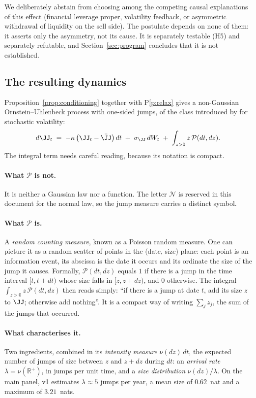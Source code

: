 We deliberately abstain from choosing among the competing causal explanations of
this effect (financial leverage proper, volatility feedback, or asymmetric
withdrawal of liquidity on the sell side). The postulate depends on none of them:
it asserts only the asymmetry, not its cause. It is separately testable (H5) and
separately refutable, and Section~\ref{sec:program} concludes that it is not
established.

\subsection{The resulting dynamics}

Proposition~\ref{prop:conditioning} together with P\ref{p:relax} gives a
non-Gaussian Ornstein--Uhlenbeck process with one-sided jumps, of the class
introduced by \citet{bns2001} for stochastic volatility:
\begin{equation}
\label{eq:ou}
d\JJ_t \;=\; -\kappa\left(\JJ_t-\bar\JJ\right)dt \;+\; \sigma_\JJ\,dW_t \;+\; \int_{z>0} z\,\mathcal{P}(dt,dz).
\end{equation}
The integral term needs careful reading, because its notation is compact.

\paragraph{What $\mathcal{P}$ is not.} It is neither a Gaussian law nor a
function. The letter $\mathcal N$ is reserved in this document for the normal
law, so the jump measure carries a distinct symbol.

\paragraph{What $\mathcal{P}$ is.} A \emph{random counting measure}, known as a
Poisson random measure. One can picture it as a random scatter of points in the
(date, size) plane: each point is an information event, its abscissa is the date
it occurs and its ordinate the size of the jump it causes. Formally,
$\mathcal{P}(dt,dz)$ equals $1$ if there is a jump in the time interval
$[t,t+dt)$ whose size falls in $[z,z+dz)$, and $0$ otherwise. The integral
$\int_{z>0} z\,\mathcal{P}(dt,dz)$ then reads simply: ``if there is a jump at
date $t$, add its size $z$ to $\JJ$; otherwise add nothing''. It is a compact
way of writing $\sum_{j} z_j$, the sum of the jumps that occurred.

\paragraph{What characterises it.} Two ingredients, combined in its
\emph{intensity measure} $\nu(dz)\,dt$, the expected number of jumps of size
between $z$ and $z+dz$ during $dt$: an \emph{arrival rate}
$\lambda=\nu(\mathbb{R}^+)$, in jumps per unit time, and a \emph{size
distribution} $\nu(dz)/\lambda$. On the main panel, v1 estimates
$\lambda\approx5$ jumps per year, a mean size of $0.62$~nat and a maximum of
$3.21$~nats.

